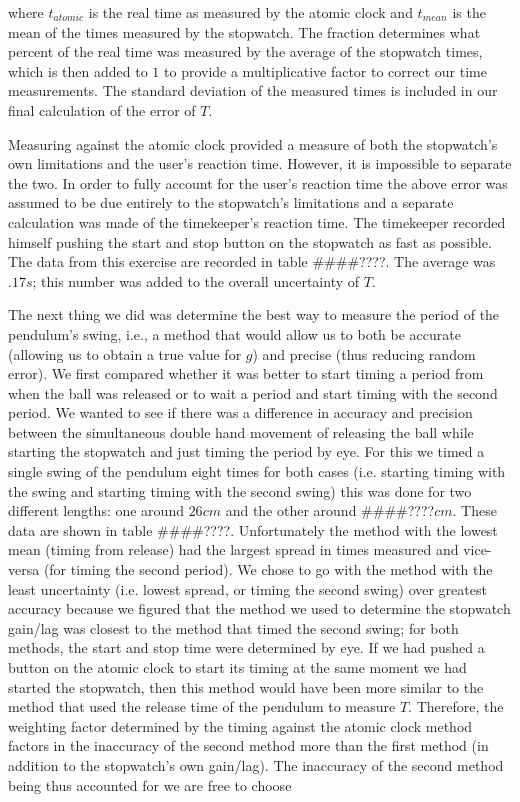 \documentclass[iop]{emulateapj}
\def\g{$g$}
\def\T{$T$}
\def\fillin{\#\#\#\#????}
\begin{document}
where $t_{atomic}$ is the real time as measured by the atomic clock 
and $t_{mean}$ is the mean of the times measured by the 
stopwatch.  The fraction determines what percent of the real time was measured 
by the average of the stopwatch times, which is then added to $1$ to provide a 
multiplicative factor to correct our time measurements.  The standard deviation 
of the measured times is included in our final calculation of the error of $T$. 


Measuring against the atomic clock provided a measure of both the stopwatch's 
own limitations and the user's reaction time.  However, it is impossible to 
separate the two.  In order to fully account for the user's reaction time the 
above error was assumed to be due entirely to the stopwatch's limitations and 
a separate calculation was made of the timekeeper's reaction time.  The 
timekeeper recorded himself pushing the start and stop button on the stopwatch 
as fast as possible.  The data from this exercise are recorded in table \fillin. 
The average was $.17s$; this number was added to the overall uncertainty of $T$. 


The next thing we did was determine the best way to measure the period of the 
pendulum's swing, i.e., a method that would allow us to both be accurate 
(allowing us to obtain a true value for \g) and precise (thus reducing random 
error). We first compared whether it was better to start timing a period from 
when the ball was released or to wait a period and start timing with the 
second period.  We wanted to see if there was a difference in accuracy and 
precision between the simultaneous double hand movement of releasing the ball 
while starting the stopwatch and just timing the period by eye. For this we 
timed a single swing of the pendulum eight times for both cases (i.e. starting 
timing with the swing and starting timing with the second swing) this was done 
for two different lengths: one around $26cm$ and the other around \fillin$cm$. 
These data are shown in table \fillin. Unfortunately the method with the lowest 
mean (timing from release) had the largest spread in times measured and 
vice-versa (for timing the second period). We chose to go 
with the method with the least uncertainty (i.e. lowest spread, or timing the 
second swing) over greatest accuracy because we figured that the method we 
used to determine the stopwatch gain/lag was closest to the method that timed 
the second swing; for both methods, the start and stop time were determined by 
eye.  If we had pushed a button on the atomic clock to start its timing at the 
same moment we had started the stopwatch, then this method would have been 
more similar to the method that used the release time of the pendulum to 
measure \T.  Therefore, the weighting factor determined by the timing against 
the atomic clock method factors in the inaccuracy of the second method more 
than the first method (in addition to the stopwatch's own gain/lag). The 
inaccuracy of the second method being thus accounted for we are free to choose 
\end{document}
